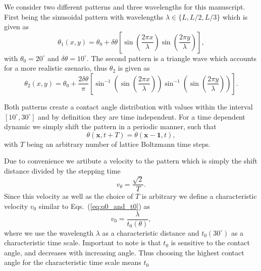 \documentclass[twocolumn,amsmath,amssymb,showpacs,pre,nofootinbib,superscriptaddress]{revtex4-1} %
\begin{document}
We consider two different patterns and three wavelengths for this manuscript.
First being the sinusoidal pattern with wavelengths $\lambda \in \{L, L/2, L/3\}$ which is given as
\begin{equation}\label{eq:sinetheta}
    \theta_1(x,y) = \theta_0 + \delta\theta\left[\sin\left(\frac{2\pi x}{\lambda}\right)\sin\left(\frac{2\pi y}{\lambda}\right)\right], 
\end{equation}
with $\theta_0 = 20^{\circ}$ and $\delta\theta=10^{\circ}$.
The second pattern is a triangle wave which accounts for a more realistic szenario, thus $\theta_2$ is given as
\begin{equation}\label{eq:triangle_wave}
    \theta_2(x,y) = \theta_0 + \frac{2\delta\theta}{\pi}\left[\sin^{-1}\left(\sin\left(\frac{2\pi x}{\lambda}\right)\right)\sin^{-1}\left(\sin\left(\frac{2\pi y}{\lambda}\right)\right)\right].
\end{equation}

Both patterns create a contact angle distribution with values within the interval $[10^{\circ}, 30^{\circ}]$ and by definition they are time independent.
For a time dependent dynamic we simply shift the pattern in a periodic manner, such that
\begin{equation}\label{eq:theta_shift}
    \theta(\mathbf{x},t+T) = \theta(\mathbf{x}-\mathbf{1}, t), 
\end{equation}
with $T$ being an arbitrary number of lattice Boltzmann time steps. 

Due to convenience we artibute a velocity to the pattern which is simply the shift distance divided by the stepping time
\begin{equation}\label{eq:pattern_speed}
    v_{\theta} = \frac{\sqrt{2}}{T}.
\end{equation}
Since this velocity as well as the choice of $T$ is arbitrary we define a characteristic velocity $v_0$ similar to Eqs.~(\ref{eq:q0_and_t0}) as
\begin{equation}\label{eq:normvel}
    v_0 = \frac{\lambda}{t_0(\theta)},
\end{equation}
where we use the wavelength $\lambda$ as a characteristic distance and $t_0(30^{\circ})$ as a characteristic time scale.
Important to note is that $t_0$ is sensitive to the contact angle, and decreases with increasing angle.
Thus choosing the highest contact angle for the characteristic time scale means $t_0$ 
\end{document}
